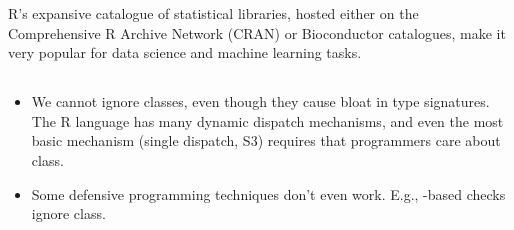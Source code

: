 R's expansive catalogue of statistical libraries, hosted either on the Comprehensive R Archive Network (CRAN) or Bioconductor catalogues, make it very popular for data science and machine learning tasks.

\subsection{}

\begin{itemize}
    \item We cannot ignore classes, even though they cause bloat in type signatures.
    The R language has many dynamic dispatch mechanisms, and even the most basic mechanism (single dispatch, S3) requires that programmers care about class.
    \item Some defensive programming techniques don't even work.
    E.g., -based checks ignore class.
\end{itemize}